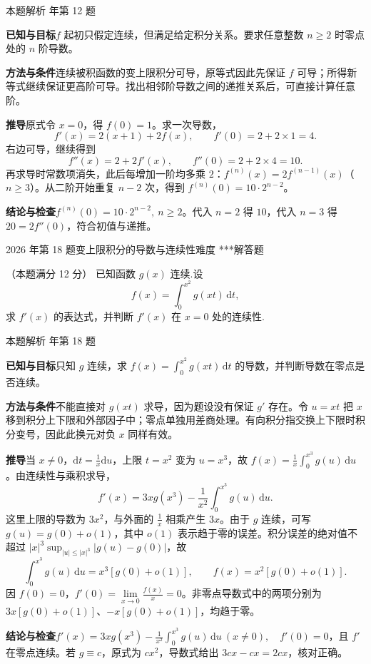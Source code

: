 \documentclass[UTF8,zihao=-4,fontset=fandol]{ctexart}
\renewcommand{\lim}{\operatorname*{lim}\limits}
\newcounter{BankQuestion}
\newcommand{\QuestionPage}[7]{%
  \stepcounter{BankQuestion}%
  \par\noindent\begin{minipage}{\linewidth}
  \raggedright
  {\small\textcolor{black!60}{#3\quad #5\quad 难度 #7}\hfill\textcolor{accent}{#2}}\par\smallskip}
\newcommand{\QuestionEnd}{\end{minipage}\par\medskip}
\newcommand{\QuestionPage}[7]{%
  \clearpage
  \stepcounter{BankQuestion}%
  {\small\textcolor{accent}{#1\hfill #2}}\par\medskip
  {\small\textcolor{black!60}{#3\quad #5\quad 难度 #7\hfill \arabic{BankQuestion} / 234}}\par\vspace{9bp}}
\newcommand{\QuestionEnd}{}
\newenvironment{QuestionSolution}[1]{%
  \clearpage
  {\small\textcolor{black!60}{本题解析\quad #1}}\par\medskip
}{\par\clearpage}
\begin{document}
\begin{QuestionSolution}{2016 年第 12 题}
\textbf{已知与目标}\quad \(f\) 起初只假定连续，但满足给定积分关系。要求任意整数 \(n\ge2\) 时零点处的 \(n\) 阶导数。

\textbf{方法与条件}\quad 连续被积函数的变上限积分可导，原等式因此先保证 \(f\) 可导；所得新等式继续保证更高阶可导。找出相邻阶导数之间的递推关系后，可直接计算任意阶。

\textbf{推导}\quad 原式令 \(x=0\)，得 \(f(0)=1\)。求一次导数，
\[
f'(x)=2(x+1)+2f(x),\qquad f'(0)=2+2\times1=4.
\]
右边可导，继续得到
\[
f''(x)=2+2f'(x),\qquad f''(0)=2+2\times4=10.
\]
再求导时常数项消失，此后每增加一阶均多乘 \(2\)：\(f^{(n)}(x)=2f^{(n-1)}(x)\)（\(n\ge3\)）。从二阶开始重复 \(n-2\) 次，得到 \(f^{(n)}(0)=10\cdot2^{n-2}\)。

\textbf{结论与检查}\quad \(\boxed{f^{(n)}(0)=10\cdot2^{n-2},\ n\ge2}\)。代入 \(n=2\) 得 \(10\)，代入 \(n=3\) 得 \(20=2f''(0)\)，符合初值与递推。
\end{QuestionSolution}

\QuestionPage{3.2 微积分基本公式与基本定理}{解答题}{2026 年第 18 题}{2}{变上限积分的导数与连续性}{151 / 234}{***}
（本题满分 12 分）
已知函数 \(g(x)\) 连续.设
\[f(x)=\int_0^{x^2} g(xt)\,\mathrm{d}t,
\]
求 \(f'(x)\) 的表达式，并判断 \(f'(x)\) 在 \(x=0\) 处的连续性.
\QuestionEnd

\begin{QuestionSolution}{2026 年第 18 题}
\textbf{已知与目标}\quad 只知 \(g\) 连续，求 \(f(x)=\int_0^{x^2}g(xt)\,\mathrm{d}t\) 的导数，并判断导数在零点是否连续。

\textbf{方法与条件}\quad 不能直接对 \(g(xt)\) 求导，因为题设没有保证 \(g'\) 存在。令 \(u=xt\) 把 \(x\) 移到积分上下限和外部因子中；零点单独用差商处理。有向积分指交换上下限时积分变号，因此此换元对负 \(x\) 同样有效。

\textbf{推导}\quad 当 \(x\ne0\)，\(\mathrm{d}t=\frac{1}{x}\mathrm{d}u\)，上限 \(t=x^2\) 变为 \(u=x^3\)，故 \(f(x)=\frac{1}{x}\int_0^{x^3}g(u)\,\mathrm{d}u\)。由连续性与乘积求导，
\[
f'(x)=3xg(x^3)-\frac1{x^2}\int_0^{x^3} g(u)\,\mathrm{d}u.
\]
这里上限的导数为 \(3x^2\)，与外面的 \(\frac{1}{x}\) 相乘产生 \(3x\)。由于 \(g\) 连续，可写 \(g(u)=g(0)+o(1)\)，其中 \(o(1)\) 表示趋于零的误差。积分误差的绝对值不超过 \(|x|^3\sup_{|u|\le|x|^3}|g(u)-g(0)|\)，故
\[
\int_0^{x^3}g(u)\,\mathrm{d}u=x^3[g(0)+o(1)],\qquad
f(x)=x^2[g(0)+o(1)].
\]
因 \(f(0)=0\)，\(f'(0)=\lim_{x\to0}\frac{f(x)}{x}=0\)。非零点导数式中的两项分别为 \(3x[g(0)+o(1)]\)、\(-x[g(0)+o(1)]\)，均趋于零。

\textbf{结论与检查}\quad \(\boxed{f'(x)=3xg(x^3)-\frac{1}{x^2}\int_0^{x^3}g(u)\,\mathrm{d}u\ (x\ne0),\quad f'(0)=0}\)，且 \(f'\) 在零点连续。若 \(g\equiv c\)，原式为 \(cx^2\)，导数式给出 \(3cx-cx=2cx\)，核对正确。
\end{QuestionSolution}
\end{document}
